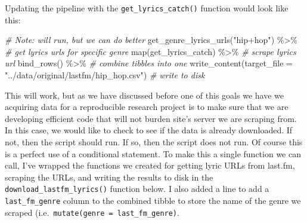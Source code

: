 \documentclass[
]{article}
\newenvironment{Shaded}{\begin{snugshade}}{\end{snugshade}}
\newcommand{\AttributeTok}[1]{\textcolor[rgb]{0.77,0.63,0.00}{#1}}
\newcommand{\CommentTok}[1]{\textcolor[rgb]{0.56,0.35,0.01}{\textit{#1}}}
\newcommand{\FunctionTok}[1]{\textcolor[rgb]{0.00,0.00,0.00}{#1}}
\newcommand{\NormalTok}[1]{#1}
\newcommand{\SpecialCharTok}[1]{\textcolor[rgb]{0.00,0.00,0.00}{#1}}
\newcommand{\StringTok}[1]{\textcolor[rgb]{0.31,0.60,0.02}{#1}}
\begin{document}
Updating the pipeline with the \texttt{get\_lyrics\_catch()} function would look like this:

\begin{Shaded}
\begin{Highlighting}[]
\CommentTok{\# Note: will run, but we can do better}
\FunctionTok{get\_genre\_lyrics\_urls}\NormalTok{(}\StringTok{"hip+hop"}\NormalTok{) }\SpecialCharTok{\%\textgreater{}\%} \CommentTok{\# get lyrics urls for specific genre}
  \FunctionTok{map}\NormalTok{(get\_lyrics\_catch) }\SpecialCharTok{\%\textgreater{}\%}  \CommentTok{\# scrape lyrics url}
  \FunctionTok{bind\_rows}\NormalTok{() }\SpecialCharTok{\%\textgreater{}\%} \CommentTok{\# combine tibbles into one}
  \FunctionTok{write\_content}\NormalTok{(}\AttributeTok{target\_file =} \StringTok{"../data/original/lastfm/hip\_hop.csv"}\NormalTok{) }\CommentTok{\# write to disk}
\end{Highlighting}
\end{Shaded}

This will work, but as we have discussed before one of this goals we have we acquiring data for a reproducible research project is to make sure that we are developing efficient code that will not burden site's server we are scraping from. In this case, we would like to check to see if the data is already downloaded. If not, then the script should run. If so, then the script does not run. Of course this is a perfect use of a conditional statement. To make this a single function we can call, I've wrapped the functions we created for getting lyric URLs from last.fm, scraping the URLs, and writing the results to disk in the \texttt{download\_lastfm\_lyrics()} function below. I also added a line to add a \texttt{last\_fm\_genre} column to the combined tibble to store the name of the genre we scraped (i.e.~\texttt{mutate(genre\ =\ last\_fm\_genre)}.
\end{document}
